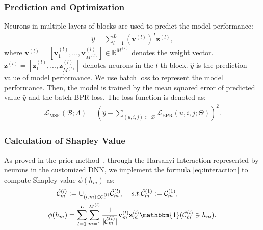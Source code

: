 \subsubsection{Prediction and Optimization}
Neurons in multiple layers of blocks are used to predict the model performance:
\begin{equation}
    \begin{aligned}
        \hat{y} = \sum_{l=1}^{L}(\mathbf{v}^{(l)})^{T}\mathbf{z}^{(l)},
    \end{aligned}
\end{equation}
where $\mathbf{v}^{(l)}=[\mathbf{v}^{(l)}_1, ..., \mathbf{v}^{(l)}_{M^{(l)}}]\in \mathbb{R}^{M^{(l)}}$ denotes the weight vector. $\mathbf{z}^{(l)}=[\mathbf{z}^{(l)}_1, ..., \mathbf{z}^{(l)}_{M^{(l)}}]$ denotes neurons in the $l$-th block. $\hat{y}$ is the prediction value of model performance. We use batch loss to represent the model performance. Then, the model is trained by the mean squared error of predicted value $\hat{y}$ and the batch BPR loss. The loss function is denoted as:
\begin{equation}
\label{eq:mse}
    \begin{aligned}
        \mathcal{L}_\text{MSE}(\mathcal{B};\Lambda) = (\hat{y} - \sum_{(u,i,j) \subset \  \mathcal{B}}\mathcal{L}_{\text{BPR}}(u,i,j;\Theta))^2.
    \end{aligned}
\end{equation}

\subsubsection{Calculation of Shapley Value}
As proved in the prior method~\cite{chen2023harsanyinet}, through the Harsanyi Interaction represented by neurons in the customized DNN, we implement the formula \ref{eq:interaction} to compute Shapley value $\phi(h_m)$ as:
\begin{equation}
    \label{eq:svcal}
    \begin{aligned}
        \mathcal{\hat{C}}_m^{(l)} &:= \cup_{(l,m)\in \mathcal{C}_m^{(l)}}\mathcal{\hat{C}}_{m}^{(l)}, \quad s.t. \mathcal{\hat{C}}_{m}^{(1)}:=\mathcal{C}_m^{(1)},\\
    \phi(h_m)&=\sum_{l=1}^L\sum_{m=1}^{M^{(l)}}\frac1{|\mathcal{\hat{C}}_m^{(l)}|}\mathbf{v}_{m}^{(l)}\mathbf{z}_{m}^{(l)}\mathbbm{1}(\mathcal{\hat{C}}_m^{(l)}\ni h_m).
    \end{aligned}
\end{equation}

